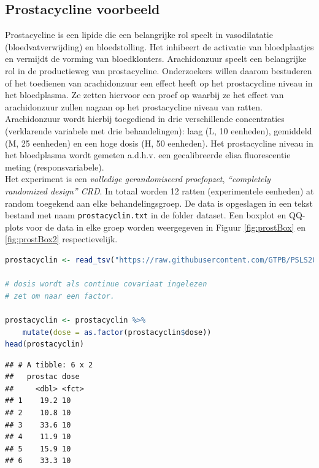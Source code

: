 \documentclass[
  12pt,dutch,coursenotes]{book}
\newcommand{\passthrough}[1]{#1}
\theoremstyle{definition}
\theoremstyle{definition}
\theoremstyle{definition}
\theoremstyle{definition}
\theoremstyle{remark}
\begin{document}
\hypertarget{prostacycline-voorbeeld}{%
\subsection{Prostacycline voorbeeld}\label{prostacycline-voorbeeld}}

Prostacycline is een lipide die een belangrijke rol speelt in vasodilatatie (bloedvatverwijding) en bloedstolling.
Het inhibeert de activatie van bloedplaatjes en vermijdt de vorming van bloedklonters.
Arachidonzuur speelt een belangrijke rol in de productieweg van prostacycline.
Onderzoekers willen daarom bestuderen of het toedienen van arachidonzuur een effect heeft op het prostacycline niveau in het bloedplasma.
Ze zetten hiervoor een proef op waarbij ze het effect van arachidonzuur zullen nagaan op het prostacycline niveau van ratten.
Arachidonzuur wordt hierbij toegediend in drie verschillende concentraties (verklarende variabele met drie behandelingen): laag (L, 10 eenheden), gemiddeld (M, 25 eenheden) en een hoge dosis (H, 50 eenheden).
Het prostacycline niveau in het bloedplasma wordt gemeten a.d.h.v. een gecalibreerde elisa fluorescentie meting (responsvariabele).\\
Het experiment is een \emph{volledige gerandomiseerd proefopzet}, \emph{``completely randomized design'' CRD}. In totaal worden 12 ratten (experimentele eenheden) at random toegekend aan elke behandelingsgroep.
De data is opgeslagen in een tekst bestand met naam \passthrough{\lstinline!prostacyclin.txt!} in de folder dataset.
Een boxplot en QQ-plots voor de data in elke groep worden weergegeven in Figuur \ref{fig:prostBox} en \ref{fig:prostBox2} respectievelijk.

\begin{lstlisting}[language=R]
prostacyclin <- read_tsv("https://raw.githubusercontent.com/GTPB/PSLS20/master/data/prostacyclin.txt")

# dosis wordt als continue covariaat ingelezen
# zet om naar een factor.

prostacyclin <- prostacyclin %>%
    mutate(dose = as.factor(prostacyclin$dose))
head(prostacyclin)
\end{lstlisting}

\begin{lstlisting}
## # A tibble: 6 x 2
##   prostac dose 
##     <dbl> <fct>
## 1    19.2 10   
## 2    10.8 10   
## 3    33.6 10   
## 4    11.9 10   
## 5    15.9 10   
## 6    33.3 10
\end{lstlisting}
\end{document}
